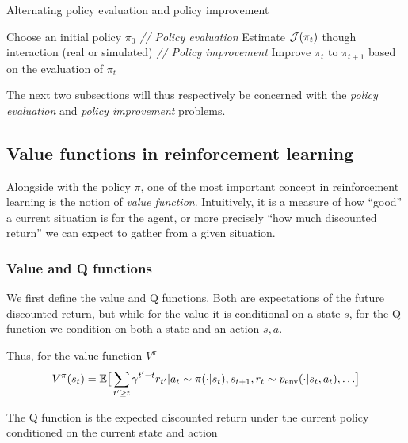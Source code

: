 \begin{center}
\begin{minipage}{0.9\textwidth}
\begin{algorithm}[H]
\caption{Alternating policy evaluation and policy improvement}
\label{alg:eval_improv}
\begin{algorithmic}[1]
\STATE Choose an initial policy $\pi_0$ 
\STATE \textit{// Policy evaluation}
\STATE Estimate ${\mathcal{J}}(\pi_t)$ though interaction (real or simulated)
\STATE \textit{// Policy improvement}
\STATE Improve $\pi_t$ to $\pi_{t+1}$ based on the evaluation of $\pi_t$
\ENDFOR
\end{algorithmic}
\end{algorithm}
\end{minipage}
\end{center}
\vspace{1em}

The next two subsections will thus respectively be concerned with the \emph{policy evaluation} and \emph{policy improvement} problems.

\subsection{Value functions in reinforcement learning}
Alongside with the policy $\pi$, one of the most important concept in reinforcement learning is the notion of \emph{value function}.
Intuitively, it is a measure of how ``good'' a current situation is for the agent, or more precisely ``how much discounted return'' we can expect to gather from a given situation.

\subsubsection{Value and Q functions}
We first define the value and Q functions. Both are expectations of the future discounted return, but while for the value it is conditional on a state $s$, for the Q function we condition on both a state and an action $s, a$.

Thus, for the value function $V^\pi$
\begin{equation}
    V^\pi(s_t) = \mathbb{E} \big[ \sum_{t' \ge t} \gamma^{t'-t} r_{t'} | {a_t \sim \pi(\cdot|s_t), s_{t+1}, r_t \sim p_{\text{env}}(\cdot | s_t, a_t), \dots} \big] 
\end{equation}

The Q function is the expected discounted return under the current policy conditioned on the current state and action

